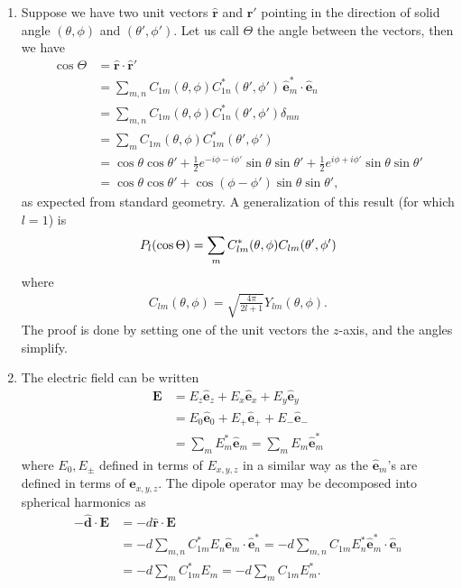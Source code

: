 \documentclass{article}
\theoremstyle{definition}
\newcommand{\f}[2]{\frac{#1}{#2}}
\begin{document}
\begin{enumerate}[label=(\alph*)]
	
	\item Suppose we have two unit vectors $\hat{\bm{r}}$ and $\hat{\bm{r}}'$ pointing in the direction of solid angle $(\theta,\phi)$ and $(\theta',\phi')$. Let us call $\Theta$ the angle between the vectors, then we have
	\begin{align*}
	\cos\Theta &= \hat{\bm{r}} \cdot \hat{\bm{r}}' \\
	&= \sum_{m,n} C_{1m}(\theta,\phi)C_{1n}^*(\theta',\phi')\, \hat{\bm{e}}_m^* \cdot  \hat{\bm{e}}_{n}\\
	&= \sum_{m,n} C_{1m}(\theta,\phi)C_{1n}^*(\theta',\phi')\delta_{mn}\\
	&= \sum_m C_{1m}(\theta,\phi)C_{1m}^*(\theta',\phi')\\
	&= \cos\theta \cos\theta' + \f{1}{2}e^{-i\phi-i\phi'}\sin\theta\sin\theta'+\f{1}{2}e^{i\phi + i\phi'}\sin\theta\sin\theta' \\
	&= \cos\theta\cos\theta' + \cos(\phi - \phi')\sin\theta\sin\theta',
	\end{align*}
	as expected from standard geometry. A generalization of this result (for which $l=1$) is 
	\begin{align*}
	\textcolor{black}{P_l(\cos\Theta) = \sum_m C_{lm}^*(\theta,\phi) C_{lm}(\theta',\phi') }
	\end{align*}
	where 
	\begin{align*}
	C_{lm}(\theta,\phi) = \sqrt{\f{4\pi}{2l+1}}Y_{lm}(\theta,\phi).
	\end{align*}
	The proof is done by setting one of the unit vectors the $z$-axis, and the angles simplify.
	
	\item The electric field can be written 
	\begin{align*}
	\bm{E} 
	&= E_z \hat{\bm{e}}_z + E_x \hat{\bm{e}}_x + E_y \hat{\bm{e}}_y\\
	&= E_0 \hat{\bm{e}}_0 + E_+ \hat{\bm{e}}_+ + E_- \hat{\bm{e}}_-\\
	&= \sum_m E_m^* \hat{\bm{e}}_m = \sum_m E_m \hat{\bm{e}}_m^* 
 	\end{align*}
 	where $E_0, E_\pm$ defined in terms of $E_{x,y,z}$ in a similar way as the $\hat{\bm{e}}_{m}$'s are defined in terms of $\hat{\bm{e}}_{x,y,z}$. The dipole operator may be decomposed into spherical harmonics as 
 	\begin{align*}
 	-\hat{\bm{d}} \cdot \bm{E} &= -d \hat{\bm{r}} \cdot \mathbf{E} \\
 	&= -d \sum_{m,n} C_{1m}^* E_n \hat{\bm{e}}_m \cdot  \hat{\bm{e}}_n^* = -d \sum_{m,n} C_{1m} E_n^* \hat{\bm{e}}_m^* \cdot  \hat{\bm{e}}_n\\
 	&= -d\sum_m C^*_{1m}E_m = -d\sum_m C_{1m}E_m^*.
 	\end{align*}
	

\end{enumerate}
\end{document}
